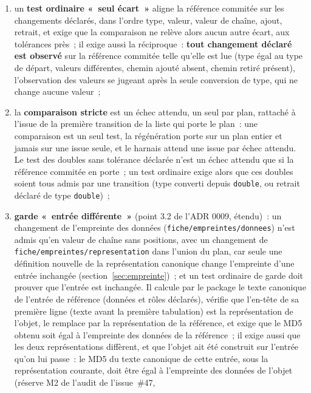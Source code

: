 \documentclass[a4paper,11pt]{article}
\newcommand{\code}[1]{\texttt{\small #1}}
\begin{document}
\begin{enumerate}[leftmargin=*, itemsep=2pt]
  \item un \textbf{test ordinaire «~seul écart~»} aligne la référence
    commitée sur les changements déclarés, dans l'ordre type, valeur, valeur
    de chaîne, ajout, retrait, et exige que la comparaison ne relève alors
    aucun autre écart, aux tolérances près~; il exige aussi la réciproque~:
    \textbf{tout changement déclaré est observé} sur la référence commitée
    telle qu'elle est lue (type égal au type de départ, valeurs différentes,
    chemin ajouté absent, chemin retiré présent), l'observation des valeurs
    se jugeant après la seule conversion de type, qui ne change aucune
    valeur~;
  \item la \textbf{comparaison stricte} est un échec attendu, un seul par
    plan, rattaché à l'issue de la première transition de la liste qui porte
    le plan~: une comparaison est un seul test, la régénération porte sur un
    plan entier et jamais sur une issue seule, et le harnais attend une issue
    par échec attendu. Le test des doubles sans tolérance déclarée n'est un
    échec attendu que si la référence commitée en porte~; un test ordinaire
    exige alors que ces doubles soient tous admis par une transition (type
    converti depuis \code{double}, ou retrait déclaré de type
    \code{double})~;
  \item \textbf{garde «~entrée différente~»} (point 3.2 de l'ADR 0009,
    étendu)~: un changement de l'empreinte des données
    (\code{fiche/empreintes/donnees}) n'est admis qu'en valeur de chaîne sans
    positions, avec un changement de \code{fiche/empreintes/representation}
    dans l'union du plan, car seule une définition nouvelle de la
    représentation canonique change l'empreinte d'une entrée inchangée
    (section~\ref{sec:empreinte})~; et un test ordinaire de garde doit
    prouver que l'entrée est inchangée. Il calcule par le package le texte
    canonique de l'entrée de référence (données et rôles déclarés), vérifie que l'en-tête de sa première
    ligne (texte avant la première tabulation) est la représentation de
    l'objet, le remplace par la représentation de la référence, et exige que
    le MD5 obtenu soit égal à l'empreinte des données de la référence~; il
    exige aussi que les deux représentations diffèrent, et que l'objet ait
    été construit sur l'entrée qu'on lui passe~: le MD5 du texte canonique
    de cette entrée, sous la représentation courante, doit être égal à
    l'empreinte des données de l'objet (réserve M2 de l'audit de l'issue~\#47,

\end{enumerate}
\end{document}
